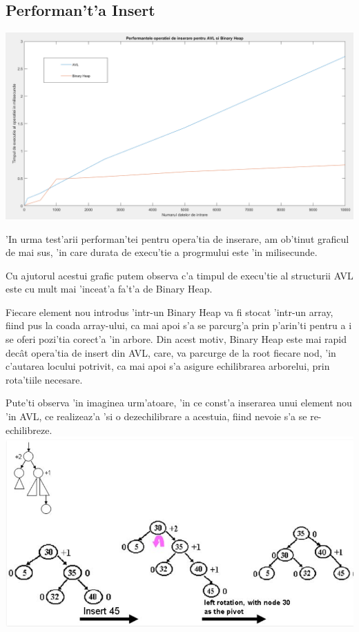 \documentclass[titlepage,12pt]{article}
\numberwithin{figure}{section}
\begin{document}
\subsection{Performan't'a Insert}
\includegraphics[scale=0.5]{Insert}
\\ \par 'In urma test'arii performan'tei pentru opera'tia de inserare, am ob'tinut graficul de mai sus, 'in care durata de execu'tie a progrmului este 'in milisecunde. 
\par Cu ajutorul acestui grafic putem observa c'a timpul de execu'tie al structurii AVL este cu mult mai 'inceat'a fa't'a de Binary Heap. 
\par Fiecare element nou introdus 'intr-un Binary Heap va fi stocat 'intr-un array, fiind pus la coada array-ului, ca mai apoi s'a se parcurg'a prin p'arin'ti pentru a i se oferi pozi'tia corect'a 'in arbore. Din acest motiv, Binary Heap este mai rapid dec\^at opera'tia de insert din AVL, care, va parcurge de la root fiecare nod, 'in c'autarea locului potrivit, ca mai apoi s'a asigure echilibrarea arborelui, prin rota'tiile necesare.
\par Pute'ti observa 'in imaginea urm'atoare, 'in ce const'a inserarea unui element nou 'in AVL, ce realizeaz'a 'si o dezechilibrare a acestuia, fiind nevoie s'a se re-echilibreze.
\\
\includegraphics[scale=0.7]{insertex}
\end{document}
